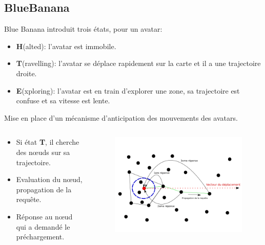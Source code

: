 \documentclass{beamer}
\begin{document}
  \subsection{BlueBanana}
  \begin{frame}
	 Blue Banana introduit trois états, pour un avatar:
        \begin{itemize}
                \item \textbf{H}(alted): l'avatar est immobile.
                \item \textbf{T}(ravelling): l'avatar se déplace rapidement sur la carte et il a une trajectoire droite.
                \item \textbf{E}(xploring): l'avatar est en train d'explorer une zone, sa trajectoire est confuse et sa vitesse est lente.
        \end{itemize}
  \end{frame}

  \begin{frame}
	Mise en place d'un mécanisme d'anticipation des mouvements des avatars.
	\begin{columns}
	  \begin{column}{5cm}
		\begin{itemize}
		  \item Si état \textbf{T}, il cherche des nœuds sur sa trajectoire.
		  \item Evaluation du nœud, propagation de la requête.
		  \item Réponse au nœud qui a demandé le préchargement.
		\end{itemize}
	  \end{column}
	\begin{column}{5cm}
	\begin{figure}
        \includegraphics[scale=0.3]{./Ressources/Images/propagation_algo.png}\\
        \label{Propa_Algo}
        \end{figure}
	\end{column}
	\end{columns}
  \end{frame}
\end{document}
